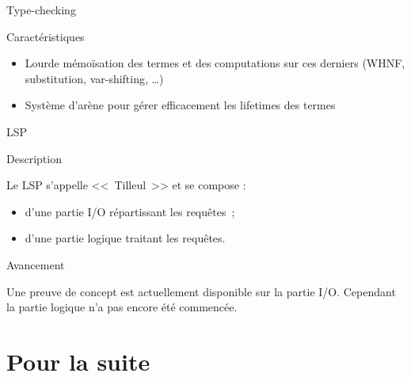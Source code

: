 \documentclass[12pt, aspectratio=169]{beamer}
\begin{document}
        \begin{frame}{Type-checking}
            
            \begin{block}{Caractéristiques}
                
                \begin{itemize}
                    \item Lourde mémoïsation des termes et des computations sur ces derniers (WHNF, substitution, var-shifting, \dots) \pause
                    \item Système d'arène pour gérer efficacement les lifetimes des termes
                \end{itemize}

            \end{block}

        \end{frame}

        \begin{frame}{LSP}
            
            \begin{block}{Description}
                
                Le LSP s'appelle <<~Tilleul~>> et se compose :

                \begin{itemize}
                    \item d'une partie I/O répartissant les requêtes~;
                    \item d'une partie logique traitant les requêtes.
                \end{itemize}

            \end{block} \pause

            \begin{block}{Avancement}
                
                Une preuve de concept est actuellement disponible sur la partie I/O. Cependant la partie logique n'a pas encore été commencée.

            \end{block}

        \end{frame}

    \section{Pour la suite}
\end{document}
